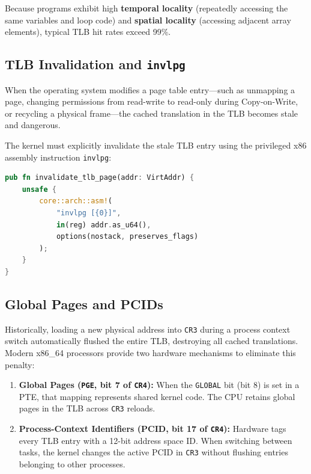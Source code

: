 Because programs exhibit high \textbf{temporal locality} (repeatedly accessing the same variables and loop code) and \textbf{spatial locality} (accessing adjacent array elements), typical TLB hit rates exceed 99\%.

\subsection{TLB Invalidation and \texttt{invlpg}}
When the operating system modifies a page table entry---such as unmapping a page, changing permissions from read-write to read-only during Copy-on-Write, or recycling a physical frame---the cached translation in the TLB becomes stale and dangerous.

The kernel must explicitly invalidate the stale TLB entry using the privileged x86 assembly instruction \texttt{invlpg}:
\begin{lstlisting}[language=Rust, caption={Invalidating a Single Page in the TLB (\texttt{src/memory/paging.rs})}]
pub fn invalidate_tlb_page(addr: VirtAddr) {
    unsafe {
        core::arch::asm!(
            "invlpg [{0}]",
            in(reg) addr.as_u64(),
            options(nostack, preserves_flags)
        );
    }
}
\end{lstlisting}

\subsection{Global Pages and PCIDs}
Historically, loading a new physical address into \texttt{CR3} during a process context switch automatically flushed the entire TLB, destroying all cached translations. Modern x86\_64 processors provide two hardware mechanisms to eliminate this penalty:
\begin{enumerate}
    \item \textbf{Global Pages (\texttt{PGE}, bit 7 of \texttt{CR4}):} When the \texttt{GLOBAL} bit (bit 8) is set in a PTE, that mapping represents shared kernel code. The CPU retains global pages in the TLB across \texttt{CR3} reloads.
    \item \textbf{Process-Context Identifiers (PCID, bit 17 of \texttt{CR4}):} Hardware tags every TLB entry with a 12-bit address space ID. When switching between tasks, the kernel changes the active PCID in \texttt{CR3} without flushing entries belonging to other processes.
\end{enumerate}

